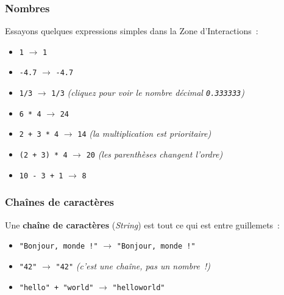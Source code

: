 \documentclass[12pt,a4paper]{article}
\newcommand{\pyret}[1]{\texttt{#1}}
\begin{document}
\subsubsection{Nombres}

Essayons quelques expressions simples dans la Zone d'Interactions~:

\begin{codeexample}
  \begin{itemize}[leftmargin=*]
    \item \pyret{1} \hspace{2em} $\rightarrow$ \texttt{1}
    \item \pyret{-4.7} \hspace{2em} $\rightarrow$ \texttt{-4.7}
    \item \pyret{1/3} \hspace{2em} $\rightarrow$ \texttt{1/3} \textit{(cliquez pour voir le nombre décimal \texttt{0.333333})}
    \item \pyret{6 * 4} \hspace{2em} $\rightarrow$ \texttt{24}
    \item \pyret{2 + 3 * 4} \hspace{2em} $\rightarrow$ \texttt{14} \textit{(la multiplication est prioritaire)}
    \item \pyret{(2 + 3) * 4} \hspace{2em} $\rightarrow$ \texttt{20} \textit{(les parenthèses changent l'ordre)}
    \item \pyret{10 - 3 + 1} \hspace{2em} $\rightarrow$ \texttt{8}
  \end{itemize}
\end{codeexample}

\subsubsection{Chaînes de caractères}

Une \textbf{chaîne de caractères} (\emph{String}) est tout ce qui est entre guillemets~:

\begin{codeexample}
  \begin{itemize}[leftmargin=*]
    \item \pyret{"Bonjour, monde !"} \hspace{2em} $\rightarrow$ \texttt{"Bonjour, monde !"}
    \item \pyret{"42"} \hspace{2em} $\rightarrow$ \texttt{"42"} \textit{(c'est une chaîne, pas un nombre~!)}
    \item \pyret{"hello" + "world"} \hspace{2em} $\rightarrow$ \texttt{"helloworld"}
  \end{itemize}
\end{codeexample}
\end{document}
